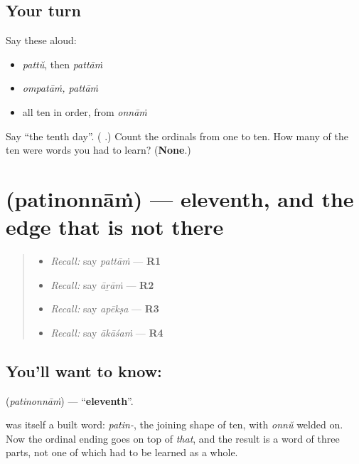 \subsection*{Your turn}
Say these aloud:

\begin{itemize}
\raggedright
  \item \emph{pattŭ}, then \emph{pattāṁ}
  \item \emph{ompatāṁ, pattāṁ}
  \item all ten in order, from \emph{onnāṁ}
\end{itemize}

\begin{tcolorbox}[breakable,colback=teal!4,colframe=teal!35!black,title={Before you move on}]
Say \textquotedblleft{}the tenth day\textquotedblright{}. (\textbf{ }.) Count the ordinals from one to ten. How many of the ten were words you had to learn? (\textbf{None}.)
\end{tcolorbox}
\section[\texorpdfstring{\ml{പതിനൊന്നാം} (patinonnāṁ)}{പതിനൊന്നാം (patinonnāṁ)}]{ (patinonnāṁ) — eleventh, and the edge that is not there}

\label{lesson:ML-C68-eleventh}



\begin{quote}
\begin{itemize}
\raggedright
  \item \emph{Recall:} say \emph{pattāṁ} — \textbf{R1}
  \item \emph{Recall:} say \emph{āṟāṁ} — \textbf{R2}
  \item \emph{Recall:} say \emph{apēkṣa} — \textbf{R3}
  \item \emph{Recall:} say \emph{ākāśaṁ} — \textbf{R4}
\end{itemize}
\end{quote}

\subsection*{You'll want to know: }
\textbf{} (\emph{patinonnāṁ}) — \textquotedblleft{}\textbf{eleventh}\textquotedblright{}.

\textbf{} was itself a built word: \emph{patin-}, the joining shape of ten, with \emph{onnŭ} welded on. Now the ordinal ending goes on top of \emph{that}, and the result is a word of three parts, not one of which had to be learned as a whole.

